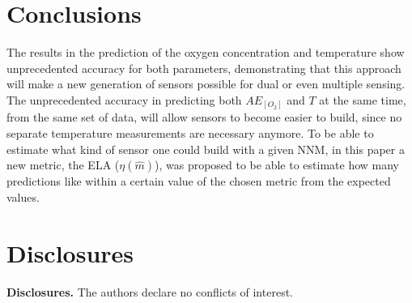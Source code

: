 \documentclass[9pt,twocolumn,twoside,pdftex]{optica}
\begin{document}
\section{Conclusions}

The results in the prediction of the oxygen concentration and temperature show unprecedented accuracy for both parameters, demonstrating that this approach will make a new generation of sensors possible for dual or even multiple sensing. The unprecedented accuracy in predicting both $AE_{[O_2]}$ and $T$ at the same time, from the same set of data, will allow sensors to become easier to build, since no separate temperature measurements are necessary anymore. To be able to estimate what kind of sensor one could build with a given NNM, in this paper a new metric, the ELA ($\eta(\hat m)$), was proposed to be able to estimate how many predictions like within a certain value of the chosen metric from the expected values.





\section*{Disclosures}

\medskip

\noindent\textbf{Disclosures.} The authors declare no conflicts of interest.






\end{document}
